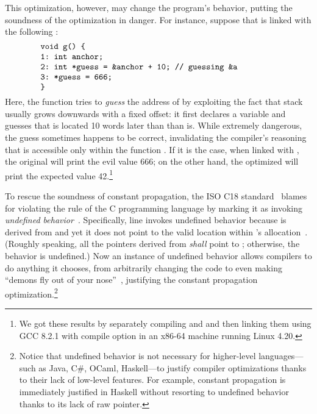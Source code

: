 This optimization, however, may change the program's behavior, putting the soundness of the
optimization in danger.  For instance, suppose that  is linked with the following
:
%
\[
\begin{minipage}{0.8\textwidth}
\begin{verbatim}
void g() {
1: int anchor;
2: int *guess = &anchor + 10; // guessing &a
3: *guess = 666;
}
\end{verbatim}
\end{minipage}
\]
%
\noindent Here, the function  tries to \emph{guess} the address of  by exploiting
the fact that stack usually grows downwards with a fixed offset: it first declares a variable
 and guesses that  is located 10 words later than than  is.  While
extremely dangerous, the guess sometimes happens to be correct, invalidating the compiler's
reasoning that  is accessible only within the function .  If it is the case, when
linked with , the original  will print the evil value 666; on the other hand,
the optimized  will print the expected value 42.\footnote{We got these results by
  separately compiling  and  and then linking them using GCC 8.2.1 with compile
  option  in an x86-64 machine running Linux 4.20.}

To rescue the soundness of constant propagation, the ISO C18 standard~\cite{c18} blames 
for violating the rule of the C programming language by marking it as invoking \emph{undefined
  behavior}~\cite[\S3.4.3p1]{c18}.  Specifically, line  invokes undefined behavior because
 is derived from  and yet it does not point to the valid location within
's allocation~\cite[\S6.5.6p8]{c18}.  (Roughly speaking, all the pointers derived from
 \emph{shall} point to ; otherwise, the behavior is undefined.)  Now an
instance of undefined behavior allows compilers to do anything it chooses, from arbitrarily changing
the code to even making ``demons fly out of your nose''~\cite{nasal-demons}, justifying the constant
propagation optimization.\footnote{Notice that undefined behavior is not necessary for higher-level
  languages---such as Java, C\#, OCaml, Haskell---to justify compiler optimizations thanks to their
  lack of low-level features.  For example, constant propagation is immediately justified in Haskell
  without resorting to undefined behavior thanks to its lack of raw pointer.}

